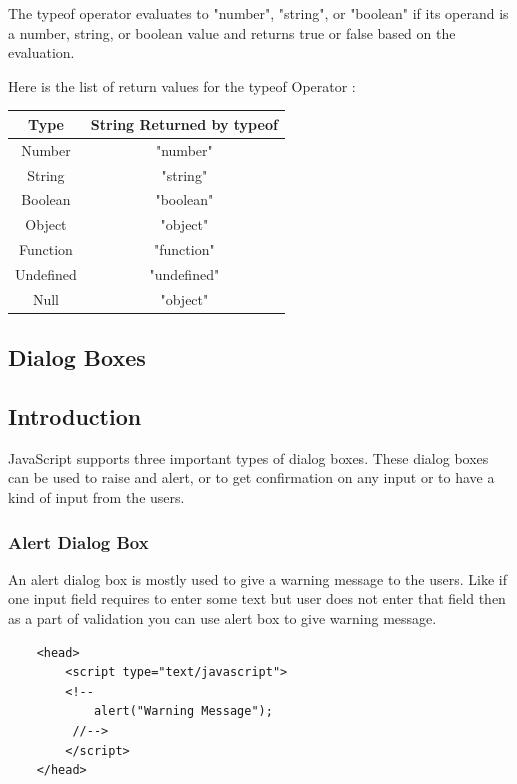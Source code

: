 \documentclass[11pt,a4paper]{article}
\begin{document}
The typeof operator evaluates to "number", "string", or "boolean" if its operand is a number, string, or boolean value and returns true or false based on the evaluation.

Here is the list of return values for the typeof Operator :
\begin{table}[ht]
\begin{center}
\begin{tabular}{| c | c |} \hline
\textbf{Type} & \textbf{String Returned by typeof}\\ \hline
Number & "number"\\ \hline
String & "string"\\ \hline
Boolean & "boolean"\\ \hline
Object & "object"\\ \hline
Function & "function"\\ \hline
Undefined & "undefined"\\ \hline
Null & "object"\\ \hline
\end{tabular}
\end{center}
\end{table}

\subsection{Dialog Boxes}
\subsection*{Introduction}
JavaScript supports three important types of dialog boxes. These dialog boxes can be used to raise and alert, or to get confirmation on any input or to have a kind of input from the users.

\subsubsection*{Alert Dialog Box}

An alert dialog box is mostly used to give a warning message to the users. Like if one input field requires to enter some text but user does not enter that field then as a part of validation you can use alert box to give warning message.
\begin{verbatim}
    <head>
        <script type="text/javascript">
        <!--
            alert("Warning Message");
         //-->
        </script>
    </head>
\end{verbatim}
\end{document}
